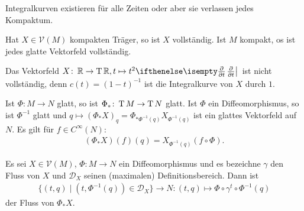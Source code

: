\begin{Bem}
  Integralkurven existieren für alle Zeiten oder aber sie verlassen jedes Kompaktum.
\end{Bem}

\begin{Kor}
Hat $X \in \mathcal V(M)$ kompakten Träger, so ist $X$ vollständig. Ist $M$ kompakt, os ist jedes glatte Vektorfeld vollständig.
\end{Kor}

\begin{bsp}
  Das Vektorfeld $X \colon \R \to \T\R, t \mapsto t^2\pdifffrac{}{t}$ ist nicht vollständig, denn $c(t) = (1-t)^{-1}$ ist die Integralkurve von $X$ durch $1$.
\end{bsp}


Ist $\Phi \colon M \to N$ glatt, so ist $\Phi_{\ast} \colon \operatorname{T} M \to \operatorname{T} N$ glatt.
Ist $\Phi$ ein Diffeomorphismus, so ist $\Phi^{-1}$ glatt und $q \mapsto (\Phi_{\ast}X)_q = \Phi_{*\Phi^{-1}(q)}X_{\Phi^{-1}(q)}$ ist ein glattes Vektorfeld auf $N$. Es gilt für $f \in C^{\infty}(N)$:
\begin{align*}
  (\Phi_{\ast}X)(f)(q) = X_{\Phi^{-1}(q)}(f \circ \Phi).
\end{align*}


\begin{Lemma}
  Es sei $X \in \mathcal V(M)$, $\Phi \colon M \to N$ ein Diffeomorphismus und es bezeichne $\gamma$ den Fluss von $X$ und $\mathcal D_X$ seinen (maximalen) Definitionsbereich.
Dann ist
\begin{align*}
  \{(t,q) \mid (t,\Phi^{-1}(q)) \in \mathcal D_X\} \to N \colon (t,q) \mapsto \Phi \circ \gamma^t \circ \Phi^{-1}(q)
\end{align*} 
der Fluss von $\Phi_{*}X$.
\end{Lemma}

